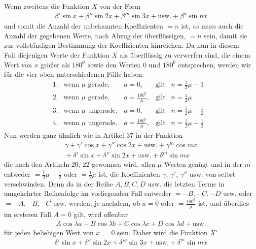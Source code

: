 \begingroup
\renewcommand{\arraystretch}{1.45}

Wenn zweitens die Funktion $X$ von der Form
\[
\begin{aligned}
&\beta'\sin x+\beta''\sin 2x+\beta'''\sin 3x+\mathrm{usw.}+\beta^n\sin nx
\end{aligned}
\]
und somit die Anzahl der unbekannten Koeffizienten $=n$ ist, so muss auch die Anzahl der gegebenen Werte,
nach Abzug der überflüssigen, $=n$ sein, damit sie zur vollständigen Bestimmung der Koeffizienten hinreichen. Da nun in diesem Fall diejenigen Werte der Funktion $X$ als überflüssig zu verwerfen sind, die einem Wert von $x$ größer als $180^0$ sowie den Werten $0$ und $180^0$ entsprechen, werden wir für die vier oben unterschiedenen Fälle haben:
\[
\begin{array}{rllcl}
1.&\text{wenn }\mu\text{ gerade},&a=0,&\text{gilt}&n=\frac12\mu-1\\
2.&\text{wenn }\mu\text{ gerade},&a=\frac{180^0}{\mu},&\text{gilt}&n=\frac12\mu\\
3.&\text{wenn }\mu\text{ ungerade},&a=0.&\text{gilt}&n=\frac12\mu-\frac12\\
4.&\text{wenn }\mu\text{ ungerade},&a=\frac{180^0}{\mu},&\text{gilt}&n=\frac12\mu-\frac12
\end{array}
\]
Nun werden ganz ähnlich wie in Artikel 37 in der Funktion
\[
\begin{aligned}
&\gamma+\gamma'\cos x+\gamma''\cos 2x+\text{usw.}+\gamma^m\cos mx\\[6pt]
&{}+\delta'\sin x+\delta''\sin 2x+\text{usw.}+\delta^m\sin mx
\end{aligned}
\]
die nach den Artikeln 20, 22 gewonnen wird, allen $\mu$ Werten genügt und in der $m$ entweder $=\frac12\mu-\frac12$ oder $=\frac12\mu$ ist, die Koeffizienten $\gamma$, $\gamma'$, $\gamma''$ usw. von selbst verschwinden. Denn da in der Reihe $A,B,C,D$ usw. die letzten Terme in umgekehrter Reihenfolge im vorliegenden Fall entweder $=-B,-C,-D$ usw. oder $=-A,-B,-C$ usw. werden, je nachdem, ob $a=0$ oder $=\frac{180^0}{\mu}$ ist, und überdies im ersteren Fall $A=0$ gilt, wird offenbar
\[
\begin{aligned}
&A\cos\lambda a+B\cos\lambda b+C\cos\lambda c+D\cos\lambda d+\text{usw.}
\end{aligned}
\]
für jeden beliebigen Wert von $x$ $=0$ sein. 
Daher wird die Funktion $X'=$
\[
\begin{aligned}
&\delta'\sin x+\delta''\sin 2x+\delta'''\sin 3x+\text{usw.}+\delta^m\sin mx
\end{aligned}
\]
